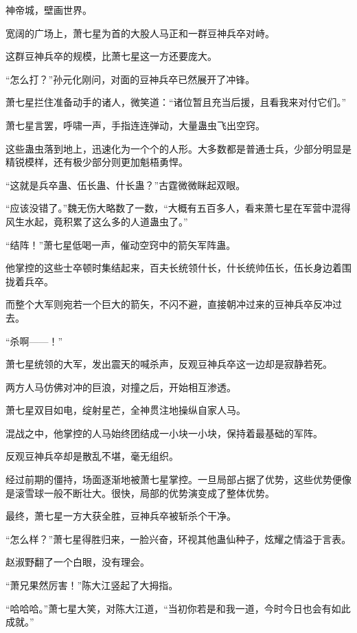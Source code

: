 
\begin{this_body}

神帝城，壁画世界。

宽阔的广场上，萧七星为首的大股人马正和一群豆神兵卒对峙。

这群豆神兵卒的规模，比萧七星这一方还要庞大。

“怎么打？”孙元化刚问，对面的豆神兵卒已然展开了冲锋。

萧七星拦住准备动手的诸人，微笑道：“诸位暂且充当后援，且看我来对付它们。”

萧七星言罢，呼啸一声，手指连连弹动，大量蛊虫飞出空窍。

这些蛊虫落到地上，迅速化为一个个的人形。大多数都是普通士兵，少部分明显是精锐模样，还有极少部分则更加魁梧勇悍。

“这就是兵卒蛊、伍长蛊、什长蛊？”古霆微微眯起双眼。

“应该没错了。”魏无伤大略数了一数，“大概有五百多人，看来萧七星在军营中混得风生水起，竟积累了这么多的人道蛊虫了。”

“结阵！”萧七星低喝一声，催动空窍中的箭矢军阵蛊。

他掌控的这些士卒顿时集结起来，百夫长统领什长，什长统帅伍长，伍长身边着围拢着兵卒。

而整个大军则宛若一个巨大的箭矢，不闪不避，直接朝冲过来的豆神兵卒反冲过去。

“杀啊——！”

萧七星统领的大军，发出震天的喊杀声，反观豆神兵卒这一边却是寂静若死。

两方人马仿佛对冲的巨浪，对撞之后，开始相互渗透。

萧七星双目如电，绽射星芒，全神贯注地操纵自家人马。

混战之中，他掌控的人马始终团结成一小块一小块，保持着最基础的军阵。

反观豆神兵卒却是散乱不堪，毫无组织。

经过前期的僵持，场面逐渐地被萧七星掌控。一旦局部占据了优势，这些优势便像是滚雪球一般不断壮大。很快，局部的优势演变成了整体优势。

最终，萧七星一方大获全胜，豆神兵卒被斩杀个干净。

“怎么样？”萧七星得胜归来，一脸兴奋，环视其他蛊仙种子，炫耀之情溢于言表。

赵淑野翻了一个白眼，没有理会。

“萧兄果然厉害！”陈大江竖起了大拇指。

“哈哈哈。”萧七星大笑，对陈大江道，“当初你若是和我一道，今时今日也会有如此成就。”


\end{this_body}
